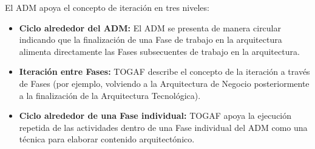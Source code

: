     El ADM apoya el concepto de iteración en tres niveles:
    \begin{itemize}
    	\item \textbf{Ciclo alrededor del ADM:} El ADM se presenta de manera circular indicando que la finalización de una Fase de trabajo en la arquitectura alimenta directamente las Fases subsecuentes de trabajo en la arquitectura.
    	\item \textbf{Iteración entre Fases:} TOGAF describe el concepto de la iteración a través de Fases (por ejemplo, volviendo a la Arquitectura de Negocio posteriormente a la finalización de la Arquitectura Tecnológica).
    	\item \textbf{Ciclo alrededor de una Fase individual:} TOGAF apoya la ejecución repetida de las actividades dentro de una Fase individual del ADM como una técnica para elaborar contenido arquitectónico.
   \end{itemize}
   

